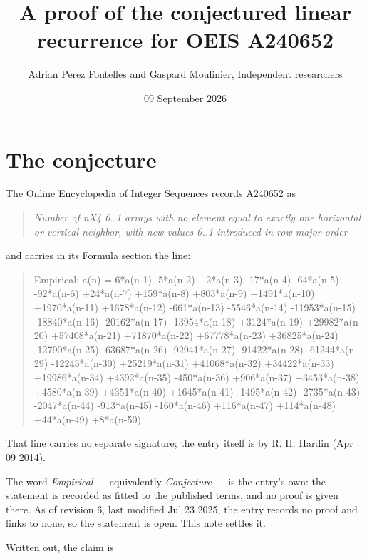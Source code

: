 \documentclass[11pt]{article}
\title{A proof of the conjectured linear recurrence for OEIS A240652}
\author{Adrian Perez Fontelles and Gaspard Moulinier, Independent researchers}
\date{09 September 2026}
\theoremstyle{definition}
\begin{document}
\maketitle
\section{The conjecture}

The Online Encyclopedia of Integer Sequences records \href{https://oeis.org/A240652}{A240652} as

\begin{quote}\itshape Number of nX4 0..1 arrays with no element equal to exactly one horizontal or vertical neighbor, with new values 0..1 introduced in row major order\end{quote}

and carries in its Formula section the line:

\begin{quote}\ttfamily Empirical: a(n) = 6*a(n-1) -5*a(n-2) +2*a(n-3) -17*a(n-4) -64*a(n-5) -92*a(n-6) +24*a(n-7) +159*a(n-8) +803*a(n-9) +1491*a(n-10) +1970*a(n-11) +1678*a(n-12) -661*a(n-13) -5546*a(n-14) -11953*a(n-15) -18840*a(n-16) -20162*a(n-17) -13954*a(n-18) +3124*a(n-19) +29982*a(n-20) +57408*a(n-21) +71870*a(n-22) +67778*a(n-23) +36825*a(n-24) -12790*a(n-25) -63687*a(n-26) -92941*a(n-27) -91422*a(n-28) -61244*a(n-29) -12245*a(n-30) +25219*a(n-31) +41068*a(n-32) +34422*a(n-33) +19986*a(n-34) +4392*a(n-35) -450*a(n-36) +906*a(n-37) +3453*a(n-38) +4580*a(n-39) +4351*a(n-40) +1645*a(n-41) -1495*a(n-42) -2735*a(n-43) -2047*a(n-44) -913*a(n-45) -160*a(n-46) +116*a(n-47) +114*a(n-48) +44*a(n-49) +8*a(n-50)\end{quote}

That line carries no separate signature; the entry itself is by R. H. Hardin (Apr 09 2014).

The word {\itshape Empirical} --- equivalently {\itshape Conjecture} --- is the entry's own: the statement is recorded as fitted to the published terms, and no proof is given there. As of revision 6, last modified Jul 23 2025, the entry records no proof and links to none, so the statement is open. This note settles it.

Written out, the claim is
\end{document}
